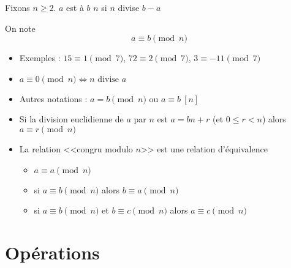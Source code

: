 \begin{frame}

\begin{mydefinition}
Fixons $n \ge 2$. $a$ est  à $b$  $n$ si $n$ divise $b-a$

\pause

On note 
$$a \equiv b \pmod n$$ 
\end{mydefinition}

\pause


\pause
\begin{itemize}
  \item Exemples : $15 \equiv 1 \pmod 7$, \pause $72 \equiv 2 \pmod {7}$, \pause $3 \equiv -11 \pmod{7}$
\pause

  \item $a\equiv 0 \pmod n \iff n \text{ divise } a$
\pause
  \item Autres notations : $a=b \pmod n$ \quad ou \quad  $a \equiv b\  [n]$
\pause  
  \item Si la division euclidienne de $a$ par $n$ est $a = bn + r$ (et $0 \le r < n$) 
alors $a \equiv r \pmod n$ 
\pause
  \item La relation <<congru modulo $n$>> est une relation d'équivalence
\pause
  \begin{itemize}
    \item $a \equiv a \pmod n$
\pause
    \item si $a \equiv b \pmod n$ alors $b \equiv a \pmod n$
\pause
    \item si $a \equiv b \pmod n$ et $b \equiv c \pmod n$ alors $a \equiv c \pmod n$
  \end{itemize}
\end{itemize}

\end{frame}

\section{Opérations}

